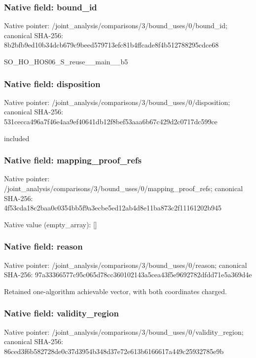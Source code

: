 \documentclass[10pt,a4paper]{article}
\begin{document}
\subsubsection{Native field: bound\_\allowbreak{}id}
Native pointer: /joint\_\allowbreak{}analysis/comparisons/3/bound\_\allowbreak{}uses/0/bound\_\allowbreak{}id; canonical SHA-256: 8b2bfb9ed10b34dcb679c9beed579713efc81b4ffcade8f4b512788295cdce68

\begingroup\raggedright\sloppy SO\_\allowbreak{}HO\_\allowbreak{}HOS06\_\allowbreak{}S\_\allowbreak{}reuse\_\allowbreak{}\_\allowbreak{}main\_\allowbreak{}\_\allowbreak{}b5\par\endgroup

\subsubsection{Native field: disposition}
Native pointer: /joint\_\allowbreak{}analysis/comparisons/3/bound\_\allowbreak{}uses/0/disposition; canonical SHA-256: 531cecca496a7f46e4aa9ef40641db12f8bef53aaa6b67c429d2c0717dc599ce

\begingroup\raggedright\sloppy included\par\endgroup

\subsubsection{Native field: mapping\_\allowbreak{}proof\_\allowbreak{}refs}
Native pointer: /joint\_\allowbreak{}analysis/comparisons/3/bound\_\allowbreak{}uses/0/mapping\_\allowbreak{}proof\_\allowbreak{}refs; canonical SHA-256: 4f53cda18c2baa0c0354bb5f9a3ecbe5ed12ab4d8e11ba873c2f11161202b945

Native value (empty\_\allowbreak{}array): []

\subsubsection{Native field: reason}
Native pointer: /joint\_\allowbreak{}analysis/comparisons/3/bound\_\allowbreak{}uses/0/reason; canonical SHA-256: 97a33366577c95c065d78cc360102143a5cea43f5e9692782dfdd71e5a369d4e

\begingroup\raggedright\sloppy Retained one-algorithm achievable vector,\allowbreak{} with both coordinates charged.\par\endgroup

\subsubsection{Native field: validity\_\allowbreak{}region}
Native pointer: /joint\_\allowbreak{}analysis/comparisons/3/bound\_\allowbreak{}uses/0/validity\_\allowbreak{}region; canonical SHA-256: 86ced3f6b582728de0c37d3954b348d37e72e613b6166617a449c25932785e9b
\end{document}

